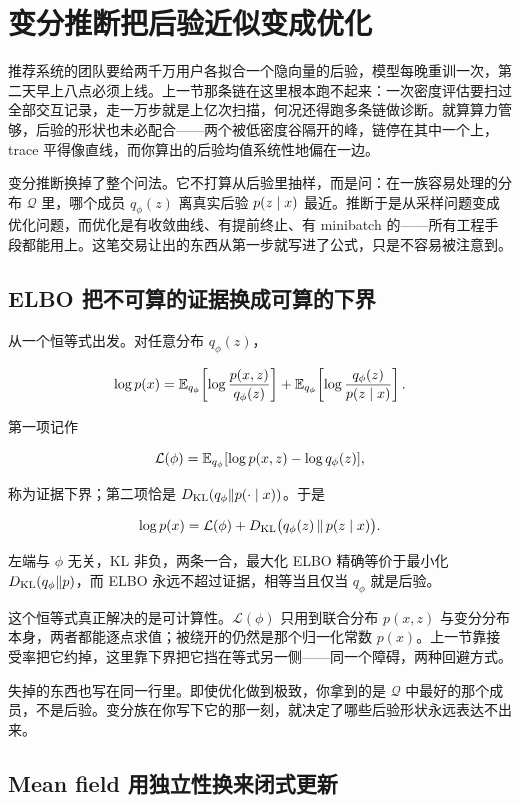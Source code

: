 \section{变分推断把后验近似变成优化}
\label{sec:13-Machine-Learning/08-Sampling-and-Inference/03}

推荐系统的团队要给两千万用户各拟合一个隐向量的后验，模型每晚重训一次，第二天早上八点必须上线。上一节那条链在这里根本跑不起来：一次密度评估要扫过全部交互记录，走一万步就是上亿次扫描，何况还得跑多条链做诊断。就算算力管够，后验的形状也未必配合——两个被低密度谷隔开的峰，链停在其中一个上，trace 平得像直线，而你算出的后验均值系统性地偏在一边。

变分推断换掉了整个问法。它不打算从后验里抽样，而是问：在一族容易处理的分布 \(\mathcal Q\) 里，哪个成员 \(q_\phi(z)\) 离真实后验 \(p(z\mid x)\) 最近。推断于是从采样问题变成优化问题，而优化是有收敛曲线、有提前终止、有 minibatch 的——所有工程手段都能用上。这笔交易让出的东西从第一步就写进了公式，只是不容易被注意到。

\subsection{ELBO 把不可算的证据换成可算的下界}

从一个恒等式出发。对任意分布 \(q_\phi(z)\)，

\[
\log p(x)
=\mathbb{E}_{q_\phi}\!\left[\log\frac{p(x,z)}{q_\phi(z)}\right]
+\mathbb{E}_{q_\phi}\!\left[\log\frac{q_\phi(z)}{p(z\mid x)}\right].
\]

第一项记作

\[
\mathcal L(\phi)=\mathbb{E}_{q_\phi}[\log p(x,z)-\log q_\phi(z)],
\]

称为证据下界；第二项恰是 \(D_{\mathrm{KL}}(q_\phi\|p(\cdot\mid x))\)。于是

\[
\log p(x)=\mathcal L(\phi)+D_{\mathrm{KL}}\bigl(q_\phi(z)\,\|\,p(z\mid x)\bigr).
\]

左端与 \(\phi\) 无关，KL 非负，两条一合，最大化 ELBO 精确等价于最小化 \(D_{\mathrm{KL}}(q_\phi\|p)\)，而 ELBO 永远不超过证据，相等当且仅当 \(q_\phi\) 就是后验。

这个恒等式真正解决的是可计算性。\(\mathcal L(\phi)\) 只用到联合分布 \(p(x,z)\) 与变分分布本身，两者都能逐点求值；被绕开的仍然是那个归一化常数 \(p(x)\)。上一节靠接受率把它约掉，这里靠下界把它挡在等式另一侧——同一个障碍，两种回避方式。

失掉的东西也写在同一行里。即使优化做到极致，你拿到的是 \(\mathcal Q\) 中最好的那个成员，不是后验。变分族在你写下它的那一刻，就决定了哪些后验形状永远表达不出来。

\subsection{Mean field 用独立性换来闭式更新}

